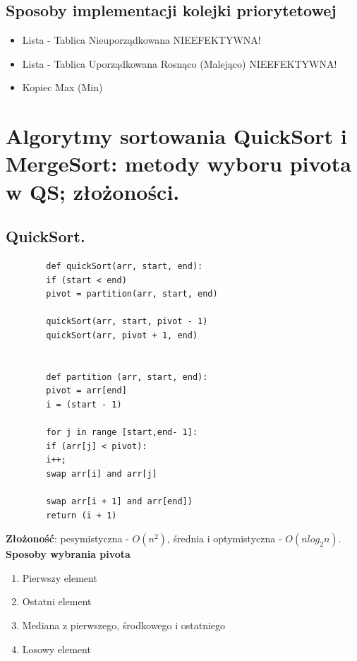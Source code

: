 \documentclass[12pt]{article}
\begin{document}
    \subsection{ Sposoby implementacji kolejki priorytetowej }
    \begin{itemize}
        \item Lista - Tablica Nieuporządkowana
        NIEEFEKTYWNA!
        \item Lista - Tablica Uporządkowana Rosnąco (Malejąco)
        NIEEFEKTYWNA!
        \item Kopiec Max (Min)
    \end{itemize}

    \newpage

    \section{Algorytmy sortowania QuickSort i MergeSort: metody wyboru pivota w QS; złożoności.}

    \subsection{QuickSort.}

    \begin{verbatim}
        def quickSort(arr, start, end):
        if (start < end)
        pivot = partition(arr, start, end)

        quickSort(arr, start, pivot - 1)
        quickSort(arr, pivot + 1, end)


        def partition (arr, start, end):
        pivot = arr[end]
        i = (start - 1)

        for j in range [start,end- 1]:
        if (arr[j] < pivot):
        i++;
        swap arr[i] and arr[j]

        swap arr[i + 1] and arr[end])
        return (i + 1)
    \end{verbatim}
    \textbf{Złożoność}: pesymistyczna - $O(n^2)$, średnia i optymistyczna - $O(nlog_2 n)$.\\

    \textbf{Sposoby wybrania pivota}
    \begin{enumerate}
        \item Pierwszy element
        \item Ostatni element
        \item Mediana z pierwszego, środkowego i ostatniego
        \item Losowy element
    \end{enumerate}
    \hfill \\\\
\end{document}
